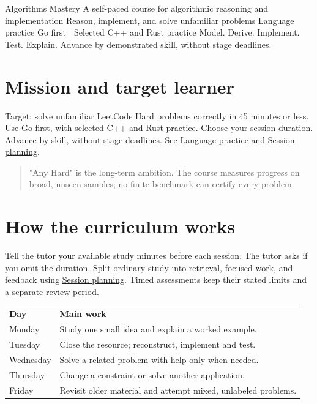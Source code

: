 \documentclass[11pt,letterpaper]{article}
\begin{document}
\coursecover
  {Algorithms Mastery}
  {A self-paced course for algorithmic reasoning and implementation}
  {Reason, implement, and solve unfamiliar problems}
  {Language practice}
  {Go first | Selected C++ and Rust practice}
  {Model. Derive. Implement. Test. Explain.}
  {Advance by demonstrated skill, without stage deadlines.}

\tableofcontents
\clearpage


\section{Mission and target learner}\label{sec:1}

Target: solve unfamiliar LeetCode Hard problems correctly in 45 minutes or less. Use Go first, with selected C++ and Rust practice. Choose your session duration. Advance by skill, without stage deadlines. See \hyperref[sec:24]{Language practice} and \hyperref[sec:25]{Session planning}.

\begin{quote}
"Any Hard" is the long-term ambition. The course measures progress on broad, unseen samples; no finite benchmark can certify every problem.
\end{quote}

\section{How the curriculum works}\label{sec:2}

Tell the tutor your available study minutes before each session. The tutor asks if you omit the duration. Split ordinary study into retrieval, focused work, and feedback using \hyperref[sec:25]{Session planning}. Timed assessments keep their stated limits and a separate review period.

\begin{center}
\small
\begin{tabular}{>{\raggedright\arraybackslash}p{}>{\raggedright\arraybackslash}p{}}
\textbf{Day} & \textbf{Main work} \\
Monday & Study one small idea and explain a worked example. \\
Tuesday & Close the resource; reconstruct, implement and test. \\
Wednesday & Solve a related problem with help only when needed. \\
Thursday & Change a constraint or solve another application. \\
Friday & Revisit older material and attempt mixed, unlabeled problems. \\
\end{tabular}
\end{center}
\end{document}
